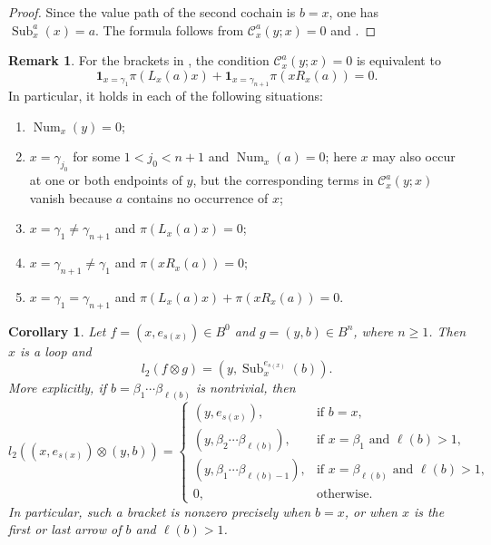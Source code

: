 \documentclass[11pt,a4paper,reqno]{amsart}
\newcommand{\mC}{\mathcal C}
\newcommand{\Sub}{\operatorname{Sub}}
\newcommand{\para}[2]{(#1,#2)}
\newcommand{\num}[2]{\operatorname{Num}_{#1}(#2)}
\newcommand{\one}{\mathbf 1}
\newcommand{\gj}{\gamma_{j_0}}
\theoremstyle{plain}
\newtheorem{corollary}[corollary]{Corollary}
\theoremstyle{definition}
\newtheorem{remark}[remark]{Remark}
\numberwithin{equation}{section}
\begin{document}
	\begin{proof}
		Since the value path of the second cochain is $b=x$, one has
		$\Sub_x^a(x)=a$.
		The formula follows from $\mC_x^a(y;x)=0$ and .
	\end{proof}
	
	\begin{remark}\label{rem:substitution-only-conditions}
		For the brackets in , the condition
		$\mC_x^a(y;x)=0$ is equivalent to
		\[
		\one_{x=\gamma_1}\pi(L_x(a)x)
		+
		\one_{x=\gamma_{n+1}}\pi(xR_x(a))
		=0.
		\]
		In particular, it holds in each of the following situations:
		\begin{enumerate}
			\item $\num{x}{y}=0$;
			\item $x=\gj$ for some $1<j_0<n+1$ and $\num{x}{a}=0$; here $x$ may
			also occur at one or both endpoints of $y$, but the corresponding terms in
			$\mC_x^a(y;x)$ vanish because $a$ contains no occurrence of $x$;
			\item $x=\gamma_1\neq\gamma_{n+1}$ and $\pi(L_x(a)x)=0$;
			\item $x=\gamma_{n+1}\neq\gamma_1$ and $\pi(xR_x(a))=0$;
			\item $x=\gamma_1=\gamma_{n+1}$ and
			$\pi(L_x(a)x)+\pi(xR_x(a))=0$.
		\end{enumerate}
	\end{remark}
	\begin{corollary}
		\label{cor:mixed-loop-deletion}
		Let $f=\para{x}{e_{s(x)}}\in B^0$ and
		$g=\para{y}{b}\in B^n$, where $n\geq1$. Then $x$ is a loop and
		\[
		l_2(f\otimes g)
		=
		\para{y}{\Sub_x^{e_{s(x)}}(b)}.
		\]
		More explicitly, if
		$b=\beta_1\cdots\beta_{\ell(b)}$
		is nontrivial, then
		\[
		l_2(\para{x}{e_{s(x)}}\otimes\para{y}{b})
		=
		\begin{cases}
			\para{y}{e_{s(x)}},
			& \text{if } b=x,\\
			\para{y}{\beta_2\cdots\beta_{\ell(b)}},
			& \text{if } x=\beta_1\text{ and }\ell(b)>1,\\
			\para{y}{\beta_1\cdots\beta_{\ell(b)-1}},
			& \text{if } x=\beta_{\ell(b)}\text{ and }\ell(b)>1,\\
			0,
			& \text{otherwise}.
		\end{cases}
		\]
		In particular, such a bracket is nonzero precisely when $b=x$, or when
		$x$ is the first or last arrow of $b$ and $\ell(b)>1$.
	\end{corollary}
	
\end{document}
